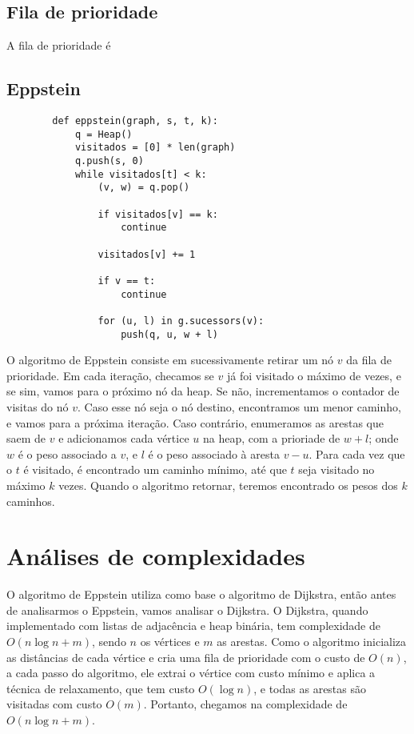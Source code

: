 \documentclass[12pt]{article}
\begin{document}
    \subsection{Fila de prioridade}
    A fila de prioridade é

    \newpage
    \subsection{Eppstein}
    \begin{verbatim}
        def eppstein(graph, s, t, k):
            q = Heap()
            visitados = [0] * len(graph)
            q.push(s, 0)
            while visitados[t] < k:
                (v, w) = q.pop()

                if visitados[v] == k:
                    continue 

                visitados[v] += 1

                if v == t:
                    continue

                for (u, l) in g.sucessors(v):
                    push(q, u, w + l)
    \end{verbatim}

    O algoritmo de Eppstein consiste em sucessivamente retirar um nó $v$ da fila
    de prioridade. Em cada iteração, checamos se $v$ já foi visitado o máximo de
    vezes, e se sim, vamos para o próximo nó da heap. Se não, incrementamos o
    contador de visitas do nó $v$. Caso esse nó seja o nó destino, encontramos
    um menor caminho, e vamos para a próxima iteração. Caso contrário,
    enumeramos as arestas que saem de $v$ e adicionamos cada vértice $u$ na
    heap, com a prioriade de $w + l$; onde $w$ é o peso associado a $v$, e $l$ é
    o peso associado à aresta $v - u$. Para cada vez que o $t$ é visitado, é
    encontrado um caminho mínimo, até que $t$ seja visitado no máximo $k$ vezes.
    Quando o algoritmo retornar, teremos encontrado os pesos dos $k$ caminhos.



    \section{Análises de complexidades}
    O algoritmo de Eppstein utiliza como base o algoritmo de Dijkstra, então antes de analisarmos o Eppstein, vamos analisar o Dijkstra.
    O Dijkstra, quando implementado com listas de adjacência e heap binária, tem complexidade de $O(n\log n + m)$, sendo $n$ os vértices e $m$ as arestas. Como o algoritmo inicializa as distâncias de cada vértice e cria uma fila de prioridade com o custo de $O(n)$, a cada passo do algoritmo, ele extrai o vértice com custo mínimo e aplica a técnica de relaxamento, que tem custo $O(\log n)$, e todas as arestas são visitadas com custo $O(m)$. Portanto, chegamos na complexidade de $O(n\log n + m)$.
    
\end{document}
